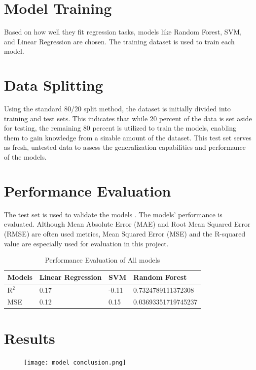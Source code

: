 \documentclass{article}
\begin{document}
\section{Model Training}

Based on how well they fit regression tasks, models like Random Forest, SVM, and Linear Regression are chosen. The training dataset is used to train each model.

\section{Data Splitting}
Using the standard 80/20 split method, the dataset is initially divided into training and test sets. This indicates that while 20 percent of the data is set aside for testing, the remaining 80 percent is utilized to train the models, enabling them to gain knowledge from a sizable amount of the dataset. This test set serves as fresh, untested data to assess the generalization capabilities and performance of the models.
\section{Performance Evaluation}

The test set is used to validate the models . The models' performance is evaluated. Although Mean Absolute Error (MAE) and Root Mean Squared Error (RMSE) are often used metrics, Mean Squared Error (MSE) and the R-squared value are especially used for evaluation in this project.

\begin{table}[ht]
\centering
\begin{tabular}{|p{2cm}|p{3cm}|p{3cm}|p{3cm}|} %
\hline
Models & Linear Regression & SVM & Random Forest \\ \hline
R$^2$ & 0.17 & -0.11 & 0.7324789111372308 \\ \hline
MSE & 0.12 & 0.15 & 0.03693351719745237 \\ \hline
\end{tabular}
\caption{Performance Evaluation of All models}
\end{table}

\section{Results}
\begin{figure}[H]
    \centering
    \texttt{[image: model conclusion.png]} 
    \vspace*{-0.5cm}
    \label{fig:eda}
\end{figure}
\vspace{1cm}
\end{document}
